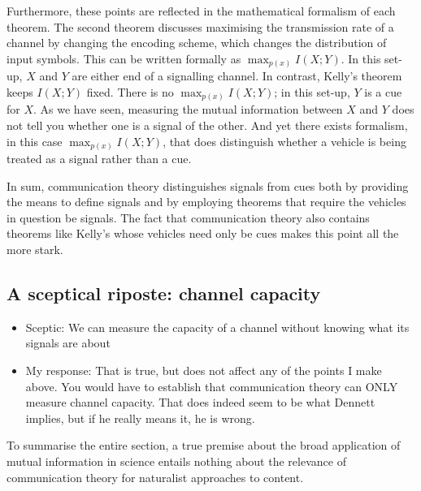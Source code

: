 Furthermore, these points are reflected in the mathematical formalism of each theorem.
The second theorem discusses maximising the transmission rate of a channel by changing the encoding scheme, which changes the distribution of input symbols.
This can be written formally as $\max_{p(x)}I(X;Y)$.
In this set-up, $X$ and $Y$ are either end of a signalling channel.
In contrast, Kelly's theorem keeps $I(X;Y)$ fixed.
There is no $\max_{p(x)}I(X;Y)$; in this set-up, $Y$ is a cue for $X$.
As we have seen, measuring the mutual information between $X$ and $Y$ does not tell you whether one is a signal of the other.
And yet there exists formalism, in this case $\max_{p(x)}I(X;Y)$, that does distinguish whether a vehicle is being treated as a signal rather than a cue.

In sum, communication theory distinguishes signals from cues both by providing the means to define signals and by employing theorems that require the vehicles in question be signals.
The fact that communication theory also contains theorems like Kelly's whose vehicles need only be cues makes this point all the more stark.

\subsection{A sceptical riposte: channel capacity}

\begin{itemize}
    \item Sceptic: We can measure the capacity of a channel without knowing what its signals are about
    \item My response: That is true, but does not affect any of the points I make above. You would have to establish that communication theory can ONLY measure channel capacity. That does indeed seem to be what Dennett implies, but if he really means it, he is wrong.
\end{itemize}

To summarise the entire section, a true premise about the broad application of mutual information in science entails nothing about the relevance of communication theory for naturalist approaches to content.
